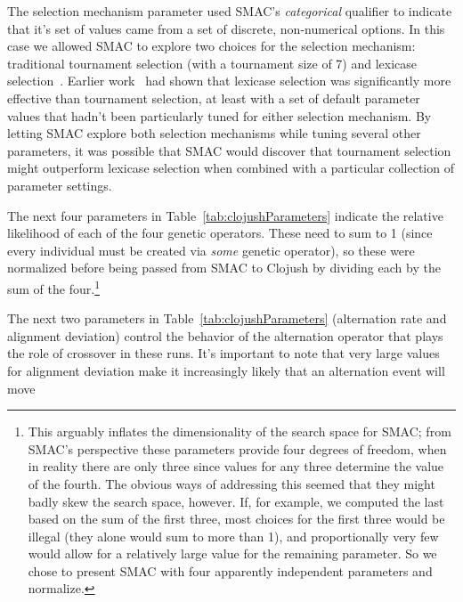 The selection mechanism parameter used SMAC's \emph{categorical} qualifier to
indicate that it's set of values came from a set of discrete, non-numerical
options. In this case we allowed SMAC to explore two choices for the selection
mechanism: traditional tournament selection (with a tournament size of 7) and
lexicase selection~\cite{lexicase:things}. Earlier 
work~\cite{Helmuth:2015:GECCO} had shown that lexicase selection was
significantly more effective than tournament selection, at least with a set of 
default parameter values that hadn't been particularly tuned for either
selection mechanism. By letting SMAC explore both selection mechanisms while
tuning several other parameters, it was possible that SMAC would discover
that tournament selection might outperform lexicase selection when combined
with a particular collection of parameter settings.

The next four parameters in Table~\ref{tab:clojushParameters} indicate the
relative likelihood of each of the four genetic operators. These need to sum
to 1 (since every individual must be created via \emph{some} genetic operator),
so these were normalized before being passed from SMAC to Clojush by dividing
each by the sum of the four.\footnote{This arguably inflates the dimensionality of the
search space for SMAC; from SMAC's perspective these parameters provide four
degrees of freedom, when in reality there are only three since values for any
three determine the value of the fourth. The obvious ways of addressing this
seemed that they might badly skew the search space, however. If, for example,
we computed the last based on the sum of the first three, most choices for the
first three would be illegal (they alone would sum to more than 1), and
proportionally very few would allow for a relatively large value for the
remaining parameter. So we chose to present SMAC with four apparently 
independent parameters and normalize.}

The next two parameters in Table~\ref{tab:clojushParameters} (alternation
rate and alignment deviation) control the behavior of the alternation
operator that plays the role of crossover in these runs. It's important to
note that very large values for alignment deviation make it increasingly
likely that an alternation event will move 

